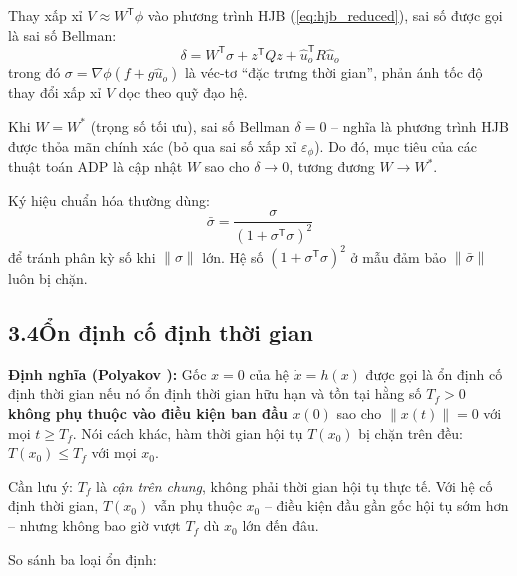 \documentclass[12pt,a4paper]{article}
\newcommand{\T}{\mathsf{T}}
\begin{document}
Thay xấp xỉ $V \approx W^\T\phi$ vào phương trình HJB (\ref{eq:hjb_reduced}), sai số được gọi là sai số Bellman:
\begin{equation}\label{eq:bellman_error}
    \delta = W^\T \sigma + z^\T Q z + \hat{u}_o^\T R \hat{u}_o
\end{equation}
trong đó $\sigma = \nabla\phi(f + g\hat{u}_o)$ là véc-tơ ``đặc trưng thời gian'', phản ánh tốc độ thay đổi xấp xỉ $V$ dọc theo quỹ đạo hệ.

Khi $W = W^*$ (trọng số tối ưu), sai số Bellman $\delta = 0$ -- nghĩa là phương trình HJB được thỏa mãn chính xác (bỏ qua sai số xấp xỉ $\varepsilon_\phi$). Do đó, mục tiêu của các thuật toán ADP là cập nhật $W$ sao cho $\delta \to 0$, tương đương $W \to W^*$.

Ký hiệu chuẩn hóa thường dùng:
\begin{equation}\label{eq:sigma_bar}
    \bar{\sigma} = \frac{\sigma}{(1 + \sigma^\T \sigma)^2}
\end{equation}
để tránh phân kỳ số khi $\|\sigma\|$ lớn. Hệ số $(1 + \sigma^\T\sigma)^2$ ở mẫu đảm bảo $\|\bar{\sigma}\|$ luôn bị chặn.

\subsection*{3.4\quad Ổn định cố định thời gian}

\textbf{Định nghĩa (Polyakov \cite{Polyakov2012}):} Gốc $x = 0$ của hệ $\dot{x} = h(x)$ được gọi là ổn định cố định thời gian nếu nó ổn định thời gian hữu hạn và tồn tại hằng số $T_f > 0$ \textbf{không phụ thuộc vào điều kiện ban đầu} $x(0)$ sao cho $\|x(t)\| = 0$ với mọi $t \geq T_f$. Nói cách khác, hàm thời gian hội tụ $T(x_0)$ bị chặn trên đều: $T(x_0) \leq T_f$ với mọi $x_0$.

Cần lưu ý: $T_f$ là \textit{cận trên chung}, không phải thời gian hội tụ thực tế. Với hệ cố định thời gian, $T(x_0)$ vẫn phụ thuộc $x_0$ -- điều kiện đầu gần gốc hội tụ sớm hơn -- nhưng không bao giờ vượt $T_f$ dù $x_0$ lớn đến đâu.

So sánh ba loại ổn định:
\end{document}
